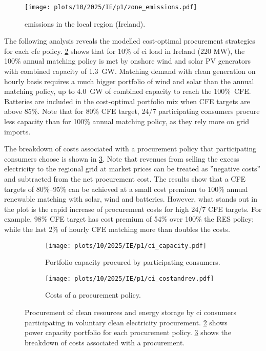 \begin{figure}
    \centering
    \texttt{[image: plots/10/2025/IE/p1/zone\_emissions.pdf]}
    \caption{\co emissions in the local region (Ireland).}
    \label{fig:10-2025-IE-p1-zone_emissions}
\end{figure}

The following analysis reveals the modelled cost-optimal procurement strategies for each \gls{cfe} policy.
\cref{fig:10-2025-IE-p1-ci_capacity} shows that for 10\% of \gls{ci} load in Ireland (220 MW), the 100\% annual matching policy is met by onshore wind and solar PV generators with combined capacity of 1.3~GW.
Matching demand with clean generation on hourly basis requires a much bigger portfolio of wind and solar than the annual matching policy, up to 4.0~GW of combined capacity to reach the 100\%~CFE.
Batteries are included in the cost-optimal portfolio mix when CFE targets are above 85\%.
Note that for 80\% CFE target, 24/7 participating consumers procure less capacity than for 100\% annual matching policy, as they rely more on grid imports.

The breakdown of costs associated with a procurement policy that participating consumers choose is shown in \cref{fig:10-2025-IE-p1-ci_costandrev}.
Note that revenues from selling the excess electricity to the regional grid at market prices can be treated as ”negative costs” and subtracted from the net procurement cost.
The results show that a CFE targets of 80\%--95\% can be achieved at a small cost premium to 100\% annual renewable matching with solar, wind and batteries.
However, what stands out in the plot is the rapid increase of procurement costs for high 24/7 CFE targets. 
For example, 98\% CFE target has cost premium of 54\% over 100\% the RES policy; while the last 2\% of hourly CFE matching more than doubles the costs.

\begin{figure}
    \centering
    \begin{subfigure}[t]{0.95\columnwidth}
        \centering
        \caption{Portfolio capacity procured by participating consumers.}
        \texttt{[image: plots/10/2025/IE/p1/ci\_capacity.pdf]}
        \label{fig:10-2025-IE-p1-ci_capacity}
    \end{subfigure}
    \begin{subfigure}[t]{0.95\columnwidth}
        \centering
        \vspace{-0.5cm}
        \caption{Costs of a procurement policy.}
        \texttt{[image: plots/10/2025/IE/p1/ci\_costandrev.pdf]}
        \label{fig:10-2025-IE-p1-ci_costandrev}
    \end{subfigure}
    \caption{Procurement of clean resources and energy storage by \gls{ci} consumers participating in voluntary clean electricity procurement. 
    \cref{fig:10-2025-IE-p1-ci_capacity} shows power capacity portfolio for each procurement policy.
    \cref{fig:10-2025-IE-p1-ci_costandrev} shows the breakdown of costs associated with a procurement.}
    \label{fig:10-2025-IE-p1-ci_procurement}
\end{figure}


